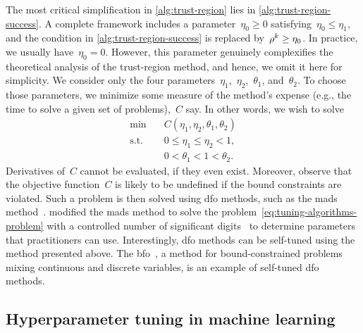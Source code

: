 The most critical simplification in \cref{alg:trust-region} lies in \cref{alg:trust-region-success}.
A complete framework includes a parameter~$\eta_0 \ge 0$ satisfying~$\eta_0 \le \eta_1$, and the condition in \cref{alg:trust-region-success} is replaced by~$\ratio[k] \ge \eta_0$.
In practice, we usually have~$\eta_0 = 0$.
However, this parameter genuinely complexifies the theoretical analysis of the trust-region method, and hence, we omit it here for simplicity.
We consider only the four parameters~$\eta_1$,~$\eta_2$,~$\theta_1$, and~$\theta_2$.
To choose those parameters, we minimize some measure of the method's expense (e.g., the  time to solve a given set of problems),~$C$ say.
In other words, we wish to solve
\begin{subequations}
    \label{eq:tuning-algorithms-problem}
    \begin{align}
        \min        & \quad C(\eta_1, \eta_2, \theta_1, \theta_2)\\
        \text{s.t.} & \quad 0 \le \eta_1 \le \eta_2 < 1,\\
                    & \quad 0 < \theta_1 < 1 < \theta_2.
    \end{align}
\end{subequations}
Derivatives of~$C$ cannot be evaluated, if they even exist.
Moreover, observe that the objective function~$C$ is likely to be undefined if the bound constraints are violated.
Such a problem is then solved using \gls{dfo} methods, such as the \gls{mads} method~\cite{Audet_Orban_2006}.
 modified the \gls{mads} method to solve the problem~\cref{eq:tuning-algorithms-problem} with a controlled number of significant digits~\cite{Audet_Digabel_Tribes_2019} to determine parameters that practitioners can use.
Interestingly, \gls{dfo} methods can be self-tuned using the method presented above.
The \gls{bfo}~\cite{Porcelli_Toint_2017}, a method for bound-constrained problems mixing continuous and discrete variables, is an example of self-tuned \gls{dfo} methods.

\subsection{Hyperparameter tuning in machine learning}
\label{subsec:machine-learning}

